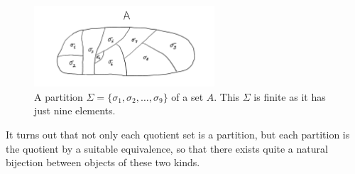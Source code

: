\documentclass[12pt,notitlepage]{article}
\theoremstyle{plain}
\theoremstyle{definition}
\theoremstyle{plain}
\newcommand{\1}{\mathbf{1}}
\newcommand{\0}{\mathbf{0}}
\begin{document}
\begin{figure}[h]
\centering
\includegraphics*[width=0.6\textwidth]{part.pdf}
\caption{A partition $\Sigma = \{\sigma_1, \sigma_2, \ldots, \sigma_9 \}$ of a set $A$. This $\Sigma$ is finite as it has just nine elements.}
\end{figure}

It turns out that not only each quotient set is a partition, but each partition is the quotient by a suitable equivalence, so that there exists quite a natural bijection between objects of these two kinds.
\end{document}
